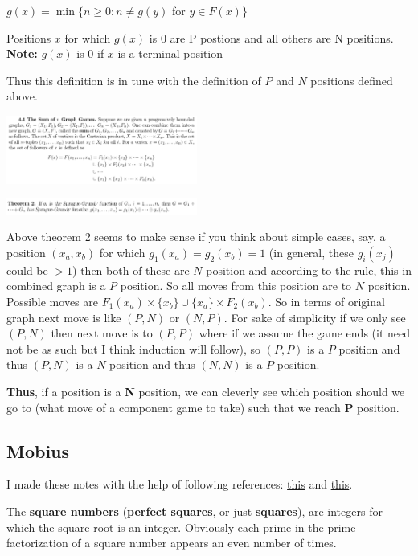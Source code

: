 \documentclass[8pt, a4paper, oneside, twocolumn]{extarticle}
\begin{document}
$g(x) = \min \{ n \geq 0 : n \neq g (y)$ for $y \in F (x)\}$

Positions $x$ for which $g(x)$ is 0 are P postions and all others are N positions. \textbf{Note:} $g(x)$ is 0 if $x$ is a terminal position

Thus this definition is in tune with the definition of $P$ and $N$ positions defined above.

\includegraphics[width=0.47\textwidth,height=0.47\textheight,keepaspectratio]{assets/sumgraph}

\includegraphics[width=0.47\textwidth,height=0.47\textheight,keepaspectratio]{assets/sgth}

Above theorem 2 seems to make sense if you think about simple cases, say, a position $(x_a, x_b)$ for which $g_1(x_a) = g_2(x_b) = 1$ (in general, these $g_i(x_j)$ could be $>1$) then both of these are $N$ position and according to the rule, this in combined graph is a $P$ position. So all moves from this position are to $N$ position. Possible moves are $F_1 (x_a) \times \{x_b\} \cup \{x_a\} \times F_2(x_b)$. So in terms of original graph next move is like $(P, N)$ or $(N, P)$. For sake of simplicity if we only see $(P, N)$ then next move is to $(P, P)$ where if we assume the game ends (it need not be as such but I think induction will follow), so $(P, P)$ is a $P$ position and thus $(P, N)$ is a $N$ position and thus $(N, N)$ is a $P$ position.

\textbf{Thus}, if a position is a \textbf{N} position, we can cleverly see which position should we go to (what move of a component game to take) such that we reach \textbf {P} position.
\subsection{Mobius}

I made these notes with the help of following references: \href{https://github.com/sourabhxyz/Competitive-Programming/blob/master/Reference%20Notes/Multiplicative.pdf}{this} and \href{https://www.quora.com/profile/Surya-Kiran/Posts/A-Dance-with-Mobius-Function}{this}.

The \textbf{square numbers} (\textbf{perfect squares}, or just \textbf{squares}), are integers for which the square root is an integer. Obviously each prime in the prime factorization of a square number appears an even number of times.
\end{document}
